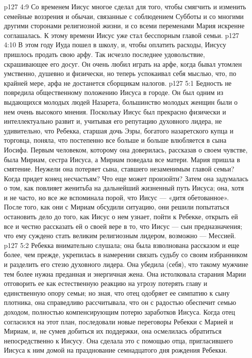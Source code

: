 \vs p127 4:9 \pc Со временем Иисус многое сделал для того, чтобы смягчить и изменить семейные воззрения и обычаи, связанные с соблюдением Субботы и со многими другими сторонами религиозной жизни, и со всеми переменами Мария искренне соглашалась. К этому времени Иисус уже стал бесспорным главой семьи.
\vs p127 4:10 В этом году Иуда пошел в школу, и, чтобы оплатить расходы, Иисусу пришлось продать свою арфу. Так исчезло последнее удовольствие, скрашивающее его досуг. Он очень любил играть на арфе, когда бывал утомлен умственно, душевно и физически, но теперь успокаивал себя мыслью, что, по крайней мере, арфа не достанется сборщикам налогов.
\vs p127 5:1 Бедность не повредила общественному положению Иисуса в городе. Он был одним из выдающихся молодых людей Назарета, большинство молодых женщин были о нем очень высокого мнения. Поскольку Иисус был прекрасно физически и интеллектуально развит и, учитывая его репутацию духовного лидера, не удивительно, что Ребекка, старшая дочь Эзры, богатого назаретского купца и торговца, поняла, что постепенно все больше и больше влюбляется в сына Иосифа. Первым человеком, которому она доверилась, рассказав о своем чувстве, была Мириам, сестра Иисуса, а Мириам поведала все матери. Мария пришла в смятение. Неужели она потеряет сына, ставшего незаменимым главой семьи? Когда придет конец несчастьям? Что еще может произойти? Затем она задумалась о том, как повлияет женитьба на дальнейший жизненный путь Иисуса; она, хотя и не часто, но все же вспоминала порой, что Иисус --- «дитя обетованное». После того, как они с Мириам обсудили ситуацию, они решили попытаться остановить дело до того, как Иисус о нем узнает, пойти к Ребекке, открыть ей все и честно рассказать ей о своей вере в то, что Иисус --- сын предназначения; что ему суждено стать великим религиозным лидером, возможно --- Мессией.
\vs p127 5:2 Ребекка внимательно слушала; она была взволнована рассказом и еще более, чем прежде, укрепилась в намерении связать судьбу со своим избранником и разделить его стезю духовного лидера. Она убедила (себя), что такому мужчине тем более нужна преданная и энергичная жена. Она истолковала старания Марии отговорить ее как естественную реакцию на угрозу потерять главу и единственную опору семьи; но зная, что отец одобряет ее симпатию к сыну плотника, она справедливо рассчитывала, что он с радостью обеспечит семью доходом, полностью компенсирующим потерю заработков Иисуса. Когда отец согласился на этот план, последовали новые переговоры Ребекки с Марией и Мириам, и, не сумев добиться их поддержки, она осмелилась обратиться непосредственно к Иисусу. Она сделала это с помощью отца, пригласившего Иисуса к ним домой на празднование семнадцатого дня рождения Ребекки.
